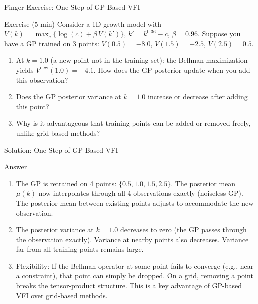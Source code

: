 \documentclass[aspectratio=169,11pt]{beamer}
\newcommand{\emphc}[1]{\textcolor{harvardcrimson}{#1}}
\begin{document}
\begin{frame}{\exercisepause{} Finger Exercise: One Step of GP-Based VFI}
\begin{exampleblock}{Exercise (5 min)}
Consider a 1D growth model with $V(k) = \max_c \{ \log(c) + \beta\, V(k') \}$, $k' = k^{0.36} - c$, $\beta = 0.96$.  Suppose you have a GP trained on 3 points: $V(0.5) = -8.0$, $V(1.5) = -2.5$, $V(2.5) = 0.5$.
\begin{enumerate}
    \item At $k = 1.0$ (a new point not in the training set): the Bellman maximization yields $V^{\text{new}}(1.0) = -4.1$.  How does the GP posterior update when you add this observation?
    \item Does the GP posterior \emphc{variance} at $k = 1.0$ increase or decrease after adding this point?
    \item Why is it advantageous that training points can be added or removed freely, unlike grid-based methods?
\end{enumerate}
\end{exampleblock}
\end{frame}

\begin{frame}{Solution: One Step of GP-Based VFI}
\begin{block}{Answer}
\begin{enumerate}
    \item The GP is retrained on 4 points: $\{0.5, 1.0, 1.5, 2.5\}$.  The posterior mean $\mu(k)$ now interpolates through all 4 observations exactly (noiseless GP).  The posterior mean between existing points adjusts to accommodate the new observation.
    \item The posterior variance at $k = 1.0$ \emphc{decreases to zero} (the GP passes through the observation exactly).  Variance at nearby points also decreases.  Variance far from all training points remains large.
    \item \emphc{Flexibility:} If the Bellman operator at some point fails to converge (e.g., near a constraint), that point can simply be dropped.  On a grid, removing a point breaks the tensor-product structure.  This is a key advantage of GP-based VFI over grid-based methods.
\end{enumerate}
\end{block}
\end{frame}
\end{document}
